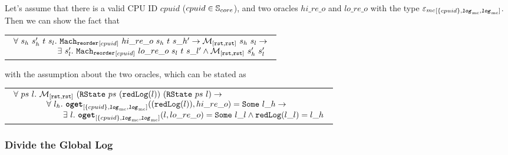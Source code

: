 \begin{lemma}
\label{lemma:chapter:conlink:reorder-refines-reorder}
Let's assume that there is a valid CPU ID $cpuid$ ($cpuid \in {\mathbb{S}_{core}}$),
and two oracles $hi\_re\_o$ and $lo\_re\_o $ with the type
${{{\varepsilon_{mc}}}_{[{\{cpuid\}}, {{{\mathrm{\texttt{\textbf{\textit{log}}}}}_{\mathrm{mc}}}}, {{{\mathrm{\texttt{\textbf{\textit{log}}}}}_{\mathrm{mc}}}}]}}$. Then we can show the fact that
\begin{center}
\begin{tabular}{P{0.95\textwidth}}
$
\begin{array}{l}
\forall \ s_h \ s_h' \ t \ s_l . \ \singlereorderstep{cpuid}{hi\_re\_o}{s_h}{t}{s\_h'} \rightarrow \matchrrstaterrstae{s_h}{s_l} \rightarrow \\
\ \ \ \ \ \ \ \ \ \ \ \ \ \ \ \ \exists\ s_l' . \  \singlereorderstep{cpuid}{lo\_re\_o}{s_l}{t}{s\_l'} \wedge  \matchrrstaterrstae{s_h'}{s_l'}\\
\end{array}
$
\end{tabular}
\end{center}
with the assumption about the two oracles, which can be stated as
\begin{center}
\begin{tabular}{P{0.95\textwidth}}
$
\begin{array}{l}
\forall \ ps \ l.\ \matchrrstaterrstae{(\rstate{ps}{(\mcreducelogfuncnoeq{l})}}{(\rstate{ps}{l})} \rightarrow \\
\ \ \ \ \ \ \ \ \ \ \ \ \forall \ l_h. \ \oget{\set{cpuid}}{\mclog}{\mclog}{(\mcreducelogfuncnoeq{l})}{hi\_re\_o}{l\_h} \rightarrow \\
\ \ \ \ \ \ \ \ \ \ \ \ \ \ \ \ \ \ \exists \ l. \ \oget{\set{cpuid}}{\mclog}{\mclog}{l}{lo\_re\_o}{l\_l} \wedge \mcreducelogfunc{l\_l}{l\_h} \\
\end{array}
$
\end{tabular}
\end{center}
\end{lemma}

\subsubsection{Divide the Global Log}

